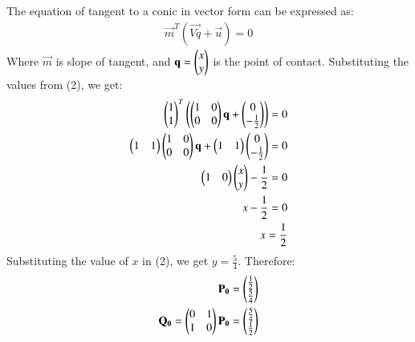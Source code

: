 \documentclass[12pt]{article}
\begin{document}
The equation of tangent to a conic in vector form can be expressed as:
\begin{align}
    \vec{m}^T(\vec{Vq} + \vec{u}) =0
\end{align}
Where $\vec{m}$ is slope of tangent, and $\mathbf{q} = \begin{pmatrix}x\\y\end{pmatrix}$ is the point of contact.
Substituting the values from (2), we get:
\begin{align}
    \begin{pmatrix}1\\1\end{pmatrix}^T\left(\begin{pmatrix}1&0\\0&0\end{pmatrix}\mathbf{q} + \begin{pmatrix}0\\-\frac{1}{2}\end{pmatrix}\right) = 0\\
    \begin{pmatrix}1&1\end{pmatrix}\begin{pmatrix}1&0\\0&0\end{pmatrix}\mathbf{q} + \begin{pmatrix}1 & 1\end{pmatrix}\begin{pmatrix}0\\-\frac{1}{2}\end{pmatrix} = 0\\
    \begin{pmatrix}1&0\end{pmatrix}\begin{pmatrix}x\\y\end{pmatrix} -\frac{1}{2} = 0\\
    x - \frac{1}{2} = 0\\
    x = \frac{1}{2}
\end{align}
Substituting the value of $x$ in (2), we get $y = \frac{5}{4}$. Therefore:
\begin{align}
\mathbf{P_0} = \begin{pmatrix}\frac{1}{2} \\ \frac{5}{4}\end{pmatrix}\\
\mathbf{Q_0} = \begin{pmatrix}0&1\\1&0\end{pmatrix}\mathbf{P_0} = \begin{pmatrix}\frac{5}{4} \\ \frac{1}{2}\end{pmatrix}
\end{align}
\end{document}
